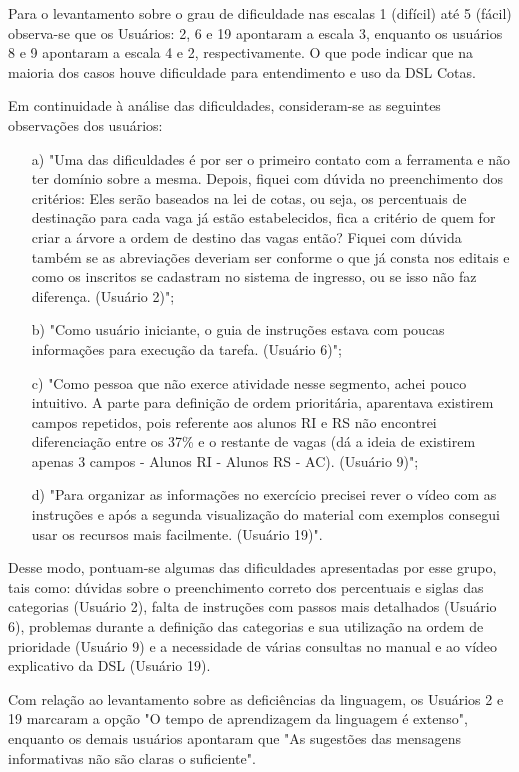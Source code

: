 \newpage
Para o levantamento sobre o grau de dificuldade nas escalas 1 (difícil) até 5 (fácil) observa-se que os Usuários: 2, 6 e 19 apontaram a escala 3, enquanto os usuários 8 e 9 apontaram a escala 4 e 2, respectivamente. O que pode indicar que na maioria dos casos houve dificuldade para entendimento e uso da DSL Cotas.

Em continuidade à análise das dificuldades, consideram-se as seguintes observações dos usuários:

\begin{enumerate}
    \item [a)] "Uma das dificuldades é por ser o primeiro contato com a ferramenta e não ter domínio sobre a mesma. Depois, fiquei com dúvida no preenchimento dos critérios: Eles serão baseados na lei de cotas, ou seja, os percentuais de destinação para cada vaga já estão estabelecidos, fica a critério de quem for criar a árvore a ordem de destino das vagas então? Fiquei com dúvida também se as abreviações deveriam ser conforme o que já consta nos editais e como os inscritos se cadastram no sistema de ingresso, ou se isso não faz diferença. (Usuário 2)"; 
    \item [b)] "Como usuário iniciante, o guia de instruções estava com poucas informações para execução da tarefa. (Usuário 6)";     
    \item [c)] "Como pessoa que não exerce atividade nesse segmento, achei pouco intuitivo. A parte para definição de ordem prioritária, aparentava existirem campos repetidos, pois referente aos alunos RI e RS não encontrei diferenciação entre os 37\% e o restante de vagas (dá a ideia de existirem apenas 3 campos - Alunos RI - Alunos RS - AC). (Usuário 9)";
    \item [d)] "Para organizar as informações no exercício precisei rever o vídeo com as instruções e após a segunda visualização do material com exemplos consegui usar os recursos mais facilmente. (Usuário 19)".     
\end{enumerate}

Desse modo, pontuam-se algumas das dificuldades apresentadas por esse grupo, tais como: dúvidas sobre o preenchimento correto dos percentuais e siglas das categorias (Usuário 2), falta de instruções com passos mais detalhados (Usuário 6), problemas durante a definição das categorias e sua utilização na ordem de prioridade (Usuário 9) e a necessidade de várias consultas no manual e ao vídeo explicativo da DSL (Usuário 19). 

Com relação ao levantamento sobre as deficiências da linguagem, os Usuários 2 e 19 marcaram a opção "O tempo de aprendizagem da linguagem é extenso", enquanto os demais usuários apontaram que "As sugestões das mensagens informativas não são claras o suficiente". 

